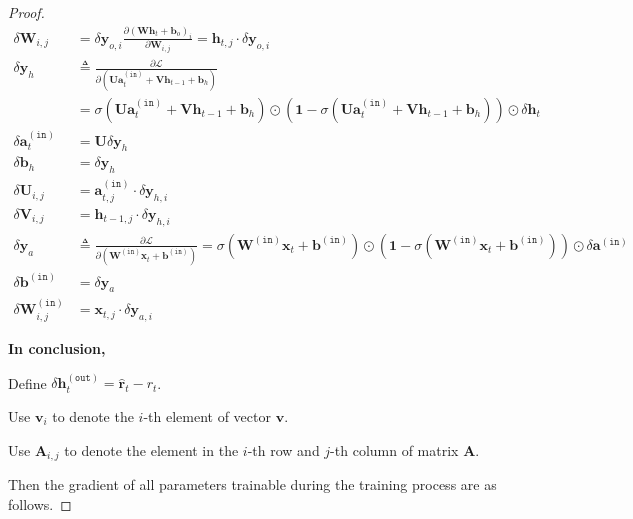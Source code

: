 \documentclass{article}
\renewcommand{\bf}[1]{\mathbf{#1}}
\renewcommand{\tt}[1]{\mathtt{#1}}
\begin{document}
\begin{proof}
\begin{align*}
        \delta\bf{W}_{i,j} &= \delta\bf{y}_{o,i}\frac{\partial\left(\bf{W}\bf{h}_{t}+\bf{b}_o\right)_i}{\partial \bf{W}_{i,j}} = \bf{h}_{t,j}\cdot\delta\bf{y}_{o,i} \\
        \delta\bf{y}_h &\triangleq \frac{\partial\mathcal{L}}{\partial\left(\bf{U}\bf{a}_t^{\tt{(in)}}+\bf{V}\bf{h}_{t-1}+\bf{b}_h\right)} \\
        &= \sigma\left(\bf{U}\bf{a}_t^{\tt{(in)}}+\bf{V}\bf{h}_{t-1}+\bf{b}_h\right)\odot\left(\bf{1}-\sigma\left(\bf{U}\bf{a}_t^{\tt{(in)}}+\bf{V}\bf{h}_{t-1}+\bf{b}_h\right)\right)\odot\delta\bf{h}_t \\
        \delta\bf{a}_t^{\tt{(in)}} &= \bf{U}\delta\bf{y}_h \\
        \delta\bf{b}_h &= \delta\bf{y}_h \\
        \delta\bf{U}_{i,j} &= \bf{a}_{t,j}^{\tt{(in)}}\cdot\delta\bf{y}_{h,i} \\
        \delta\bf{V}_{i,j} &= \bf{h}_{t-1,j}\cdot\delta\bf{y}_{h,i} \\
        \delta\bf{y}_a & \triangleq\frac{\partial\mathcal{L}}{\partial\left(\bf{W}^{\tt{(in)}}\bf{x}_t+\bf{b}^{\tt{(in)}}\right)} = \sigma\left(\bf{W}^{\tt{(in)}}\bf{x}_t+\bf{b}^{\tt{(in)}}\right) \odot \left(\bf{1}-\sigma\left(\bf{W}^{\tt{(in)}}\bf{x}_t+\bf{b}^{\tt{(in)}}\right)\right) \odot \delta\bf{a}^{\tt{(in)}} \\
        \delta\bf{b}^{\tt{(in)}} &= \delta \bf{y}_a \\
        \delta\bf{W}^{\tt{(in)}}_{i,j} &= \bf{x}_{t,j}\cdot\delta\bf{y}_{a,i}
    \end{align*}
    
    \vspace{3em}\hspace{-2em}
    \textbf{In conclusion,}
    
    \hspace{1.3em}
    Define $\delta\bf{h}_{t}^{\tt{(out)}}=\hat{\bf{r}}_t-r_t$.
    
    \hspace{1.3em}
    Use $\bf{v}_i$ to denote the $i$-th element of vector $\bf{v}$. 
    
    \hspace{1.3em}
    Use $\bf{A}_{i,j}$ to denote the element in the $i$-th row and $j$-th column of matrix $\bf{A}$.
    
    \hspace{1.3em}
    Then the gradient of all parameters trainable during the training process are as follows.
    

\end{proof}
\end{document}
